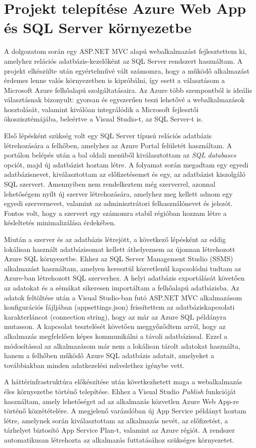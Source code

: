 \section{Projekt telepítése Azure Web App és SQL Server környezetbe}

A dolgozatom során egy ASP.NET MVC alapú webalkalmazást fejlesztettem ki, amelyhez relációs adatbázis-kezelőként az SQL Server rendszert használtam. A projekt elkészülte után egyértelművé vált számomra, hogy a működő alkalmazást érdemes lenne valós környezetben is kipróbálni, így esett a választásom a Microsoft Azure felhőalapú szolgáltatásaira. Az Azure több szempontból is ideális választásnak bizonyult: gyorsan és egyszerűen teszi lehetővé a webalkalmazások hosztolását, valamint kiválóan integrálódik a Microsoft fejlesztői ökoszisztémájába, beleértve a Visual Studio-t, az SQL Server-t is. 

Első lépésként szükség volt egy SQL Server típusú relációs adatbázis létrehozására a felhőben, amelyhez az Azure Portal felületét használtam. A portálon belépés után a bal oldali menüből kiválasztottam az \textit{SQL databases} opciót, majd új adatbázist hoztam létre. A folyamat során megadtam egy egyedi adatbázisnevet, kiválasztottam az előfizetésemet és egy, az adatbázist kiszolgáló SQL szervert. Amennyiben nem rendelkeztem még szerverrel, azonnal lehetőségem nyílt új szerver létrehozására, amelyhez meg kellett adnom egy egyedi szervernevet, valamint az adminisztrátori felhasználónevet és jelszót. Fontos volt, hogy a szervert egy számomra stabil régióban hozzam létre a késleltetés minimalizálása érdekében.

Miután a szerver és az adatbázis létrejött, a következő lépésként az eddig lokálisan használt adatbázisomat kellett áthelyeznem az újonnan létrehozott Azure SQL környezetbe. Ehhez az SQL Server Management Studio (SSMS) alkalmazást használtam, amelyen keresztül közvetlenül kapcsolódni tudtam az Azure-ban létrehozott SQL szerverhez. A helyi adatbázis exportálását követően az adatokat és a sémákat sikeresen importáltam a felhőalapú adatbázisba. Az adatok feltöltése után a Visual Studio-ban futó ASP.NET MVC alkalmazásom konfigurációs fájljában (appsettings.json) frissítettem az adatbáziskapcsolati karakterláncot (connection string), hogy az már az Azure SQL példányra mutasson. A kapcsolat tesztelését követően meggyőződtem arról, hogy az alkalmazás megfelelően képes kommunikálni a távoli adatbázissal. Ezzel a módosítással az alkalmazásom már nem a lokálisan tárolt adatokat használta, hanem a felhőben működő Azure SQL adatbázis adatait, amelyeket a továbbiakban minden adatkezelési művelethez igénybe vett.

A háttérinfrastruktúra előkészítése után következhetett maga a webalkalmazás éles környezetbe történő telepítése. Ehhez a Visual Studio \textit{Publish} funkcióját használtam, amely lehetőséget ad az alkalmazás közvetlen Azure Web App-re történő közzétételére. A megjelenő varázslóban új App Service példányt hoztam létre, amelynek során kiválasztottam az alkalmazás nevét, az előfizetést, a tárhelyet biztosító App Service Plan-t, valamint az Azure régiót. A rendszer automatikusan létrehozta az alkalmazás futtatásához szükséges környezetet.




